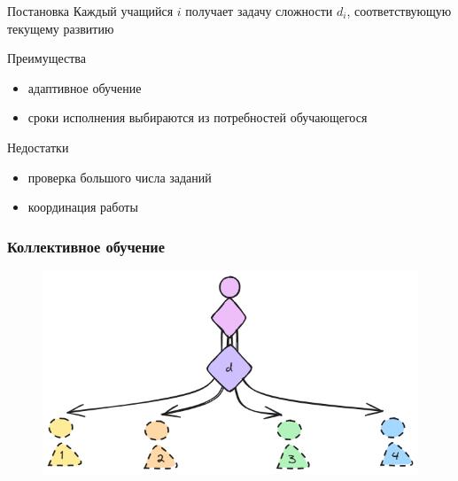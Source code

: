 \begin{frame}
    \begin{block}{Постановка}
        Каждый учащийся $i$ получает задачу сложности $d_i$, соответствующую текущему развитию
    \end{block}

    \begin{exampleblock}{Преимущества}
        \begin{itemize}
            \item адаптивное обучение
            \item сроки исполнения выбираются из потребностей обучающегося
        \end{itemize}

    \end{exampleblock}

    \begin{alertblock}{Недостатки}
        \begin{itemize}
            \item проверка большого числа заданий
            \item координация работы
        \end{itemize}
    \end{alertblock}
\end{frame}


\begin{frame}
    \frametitle{Коллективное обучение}
    \centering
    \begin{figure}
        \includegraphics[width=0.9\linewidth]{assets/setting/real.excalidraw.png}
    \end{figure} 
\end{frame}

